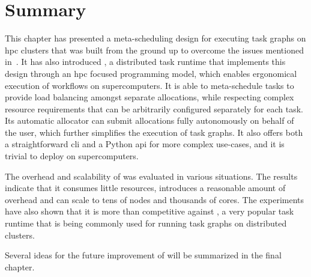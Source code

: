 \section*{Summary}
This chapter has presented a meta-scheduling design for executing task graphs on
\gls{hpc} clusters that was built from the ground up to overcome the issues mentioned
in~. It has also introduced \hyperqueue{}, a distributed task
runtime that implements this design through an \gls{hpc} focused programming model,
which enables ergonomical execution of workflows on supercomputers. It is able to meta-schedule
tasks to provide load balancing amongst separate allocations, while respecting complex resource
requirements that can be arbitrarily configured separately for each task. Its automatic allocator
can submit allocations fully autonomously on behalf of the user, which further simplifies the
execution of \hyperqueue{} task graphs. It also offers both a straightforward
\gls{cli} and a Python \gls{api} for more complex use-cases, and it is
trivial to deploy on supercomputers.

The overhead and scalability of \hyperqueue{} was evaluated in various situations. The
results indicate that it consumes little resources, introduces a reasonable amount of overhead and
can scale to tens of nodes and thousands of cores. The experiments have also shown that it is more
than competitive against \dask{}, a very popular task runtime that is being
commonly used for running task graphs on distributed clusters.

Several ideas for the future improvement of \hyperqueue{} will be summarized in the final
chapter.
